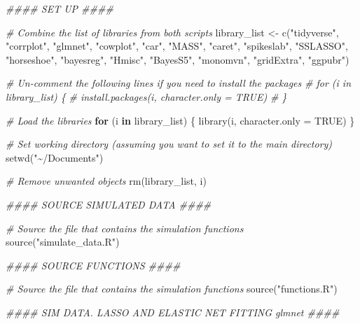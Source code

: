 \documentclass[
  11pt,
]{article}
\newenvironment{Shaded}{}{}
\newcommand{\AttributeTok}[1]{\textcolor[rgb]{0.49,0.56,0.16}{#1}}
\newcommand{\CommentTok}[1]{\textcolor[rgb]{0.38,0.63,0.69}{\textit{#1}}}
\newcommand{\ConstantTok}[1]{\textcolor[rgb]{0.53,0.00,0.00}{#1}}
\newcommand{\ControlFlowTok}[1]{\textcolor[rgb]{0.00,0.44,0.13}{\textbf{#1}}}
\newcommand{\DocumentationTok}[1]{\textcolor[rgb]{0.73,0.13,0.13}{\textit{#1}}}
\newcommand{\FunctionTok}[1]{\textcolor[rgb]{0.02,0.16,0.49}{#1}}
\newcommand{\NormalTok}[1]{#1}
\newcommand{\OtherTok}[1]{\textcolor[rgb]{0.00,0.44,0.13}{#1}}
\newcommand{\StringTok}[1]{\textcolor[rgb]{0.25,0.44,0.63}{#1}}
\begin{document}
\begin{Shaded}
\begin{Highlighting}[]
\DocumentationTok{\#\#\#\# SET UP \#\#\#\#}

\CommentTok{\# Combine the list of libraries from both scripts}
\NormalTok{library\_list }\OtherTok{\textless{}{-}} \FunctionTok{c}\NormalTok{(}\StringTok{"tidyverse"}\NormalTok{, }\StringTok{"corrplot"}\NormalTok{, }\StringTok{"glmnet"}\NormalTok{, }\StringTok{"cowplot"}\NormalTok{, }\StringTok{"car"}\NormalTok{, }\StringTok{"MASS"}\NormalTok{, }
                  \StringTok{"caret"}\NormalTok{, }\StringTok{"spikeslab"}\NormalTok{, }\StringTok{"SSLASSO"}\NormalTok{, }\StringTok{"horseshoe"}\NormalTok{, }\StringTok{"bayesreg"}\NormalTok{, }
                  \StringTok{"Hmisc"}\NormalTok{, }\StringTok{"BayesS5"}\NormalTok{, }\StringTok{"monomvn"}\NormalTok{, }\StringTok{"gridExtra"}\NormalTok{, }\StringTok{"ggpubr"}\NormalTok{)}

\CommentTok{\# Un{-}comment the following lines if you need to install the packages}
\CommentTok{\# for (i in library\_list) \{}
\CommentTok{\#   install.packages(i, character.only = TRUE)}
\CommentTok{\# \}}

\CommentTok{\# Load the libraries}
\ControlFlowTok{for}\NormalTok{ (i }\ControlFlowTok{in}\NormalTok{ library\_list) \{}
  \FunctionTok{library}\NormalTok{(i, }\AttributeTok{character.only =} \ConstantTok{TRUE}\NormalTok{)}
\NormalTok{\}}

\CommentTok{\# Set working directory (assuming you want to set it to the \textquotesingle{}main\textquotesingle{} directory)}
\FunctionTok{setwd}\NormalTok{(}\StringTok{"\textasciitilde{}/Documents"}\NormalTok{)}

\CommentTok{\# Remove unwanted objects}
\FunctionTok{rm}\NormalTok{(library\_list, i)}

\DocumentationTok{\#\#\#\# SOURCE SIMULATED DATA \#\#\#\#}

\CommentTok{\# Source the file that contains the simulation functions}
\FunctionTok{source}\NormalTok{(}\StringTok{"simulate\_data.R"}\NormalTok{)}

\DocumentationTok{\#\#\#\# SOURCE FUNCTIONS \#\#\#\#}

\CommentTok{\# Source the file that contains the simulation functions}
\FunctionTok{source}\NormalTok{(}\StringTok{"functions.R"}\NormalTok{)}

\DocumentationTok{\#\#\#\# SIM DATA. LASSO AND ELASTIC NET FITTING \textquotesingle{}glmnet\textquotesingle{} \#\#\#\#}


\end{Highlighting}
\end{Shaded}
\end{document}
